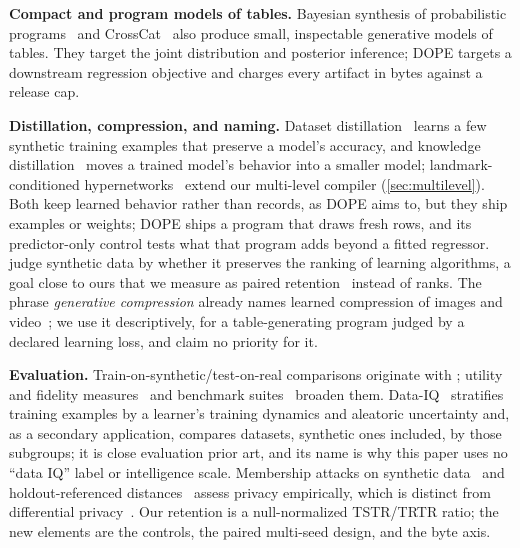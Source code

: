 \documentclass{article} %
\begin{document}
\textbf{Compact and program models of tables.} Bayesian synthesis of probabilistic programs~\citep{saad2019bayesian} and CrossCat~\citep{mansinghka2016crosscat} also produce small, inspectable generative models of tables. They target the joint distribution and posterior inference; DOPE targets a downstream regression objective and charges every artifact in bytes against a release cap.

\textbf{Distillation, compression, and naming.} Dataset distillation~\citep{wang2018distillation} learns a few synthetic training examples that preserve a model's accuracy, and knowledge distillation~\citep{hinton2015distilling} moves a trained model's behavior into a smaller model; landmark-conditioned hypernetworks~\citep{pfahringer2000landmarking,ha2017hypernetworks,bertinetto2019closedform} extend our multi-level compiler (\cref{sec:multilevel}). Both keep learned behavior rather than records, as DOPE aims to, but they ship examples or weights; DOPE ships a program that draws fresh rows, and its predictor-only control tests what that program adds beyond a fitted regressor. \citet{jordon2018measuring} judge synthetic data by whether it preserves the ranking of learning algorithms, a goal close to ours that we measure as paired retention~\citep{bradley1952rank,elo1978rating} instead of ranks. The phrase \emph{generative compression} already names learned compression of images and video~\citep{santurkar2017generative}; we use it descriptively, for a table-generating program judged by a declared learning loss, and claim no priority for it.

\textbf{Evaluation.} Train-on-synthetic/test-on-real comparisons originate with \citet{esteban2017rcgan}; utility and fidelity measures~\citep{snoke2018utility,raab2018practical,alaa2022faithful,zhang2020sdmetrics} and benchmark suites~\citep{qian2023synthcity,mcelfresh2023tabzilla,erickson2026tabarena} broaden them. Data-IQ~\citep{seedat2022dataiq} stratifies training examples by a learner's training dynamics and aleatoric uncertainty and, as a secondary application, compares datasets, synthetic ones included, by those subgroups; it is close evaluation prior art, and its name is why this paper uses no ``data IQ'' label or intelligence scale. Membership attacks on synthetic data~\citep{shokri2017membership,hayes2018logan,vanbreugel2023domias,stadler2022groundhog} and holdout-referenced distances~\citep{platzer2021holdout} assess privacy empirically, which is distinct from differential privacy~\citep{dwork2014foundations}. Our retention is a null-normalized TSTR/TRTR ratio; the new elements are the controls, the paired multi-seed design, and the byte axis.
\end{document}
